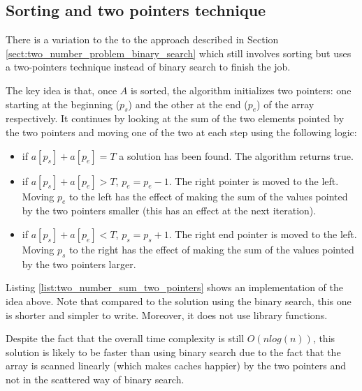 


\subsection{Sorting and two pointers technique}
\label{sec:two_numbers:twopointers}

There is a variation to the to the approach described in Section
\ref{sect:two_number_problem_binary_search} which still involves sorting but uses a two-pointers
technique instead of binary search to finish the job. 

The key idea is that, once $A$ is sorted, the algorithm initializes
two pointers: one starting at the beginning ($p_s$) and the other at the end ($p_e$) of the array respectively.
It continues by looking at the sum of the two elements pointed by the two pointers and moving one of
the two at each step using the following logic: 
\begin{itemize}
	\item if $a[p_s]+a[p_e] = T$ a solution has been found. The algorithm returns true.
	\item if $a[p_s]+a[p_e] > T$, $p_e=p_e-1$. The right pointer is moved to the left. 
	Moving	$p_e$ to the left has the effect of making the sum of the values pointed by the two pointers smaller (this has an effect at the next iteration). 
	\item if $a[p_s]+a[p_e] < T$, $p_s=p_s+1$. The right end pointer is moved to the left. Moving $p_s$ to the right has the effect of making the sum of the values pointed by the two pointers larger. 
\end{itemize}



Listing \ref{list:two_number_sum_two_pointers} shows an implementation of the idea above. Note that compared to the solution using the binary search, this one is shorter and simpler to write. Moreover, it does not use library functions. 



Despite the fact that the overall time complexity is still $O(n log(n))$, this solution is likely to be faster than
using binary search due to the fact that the array is scanned linearly (which makes caches happier) by the two pointers and not in the scattered way of binary search.

